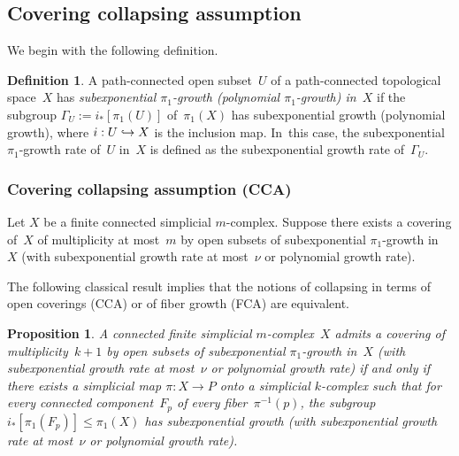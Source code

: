 \documentclass[JEP,XML,SOM,Unicode,NoFloatCountersInSection,published]{cedram}
\newcommand\hto{\mathrel{\lhook\joinrel\to}}
\newtheorem{proposition}[theorem]{Proposition}
\theoremstyle{definition}
\newtheorem{definition}[theorem]{Definition}
\begin{document}
\subsection{Covering collapsing assumption} \label{sec:zerovol}
We begin with the following definition.

\begin{definition} \label{def:subexp}
A path-connected open subset~$U$ of a path-connected topological space~$X$ has \emph{subexponential $\pi_1$-growth (\resp polynomial $\pi_1$-growth) in~$X$} if the subgroup $\Gamma_U:=i_*[\pi_1(U)]$ of~$\pi_1(X)$ has subexponential growth (\resp polynomial growth), where $i:U \hto X$ is the inclusion map. In~this case, the subexponential $\pi_1$-growth rate of~$U$ in~$X$ is defined as the subexponential growth rate of~$\Gamma_U$.
\end{definition}

\subsubsection*{Covering collapsing assumption (CCA)}
Let $X$ be a finite connected simplicial $m$\nobreakdash-complex.
Suppose there exists a covering of~$X$ of multiplicity at most~$m$ by open subsets of subexponential $\pi_1$-growth in~$X$ (with subexponential growth rate at most~$\nu$ or polynomial growth rate).

The following classical result implies that the notions of collapsing in terms of open coverings (CCA) or of fiber growth (FCA) are equivalent.

\begin{proposition} \label{prop:cover}
A connected finite simplicial $m$\nobreakdash-complex~$X$ admits a covering of multiplicity~$k+1$ by open subsets of subexponential $\pi_1$-growth in~$X$ (with subexponential growth rate at most~$\nu$ or polynomial growth rate) if and only if there exists a simplicial map $\pi:X \to P$ onto a simplicial $k$-complex such that for every connected component~$F_p$ of every fiber~$\pi^{-1}(p)$, the subgroup $i_*[\pi_1(F_p)] \leqslant \pi_1(X)$ has subexponential growth (with subexponential growth rate at most~$\nu$ or polynomial growth rate).
\end{proposition}
\end{document}
